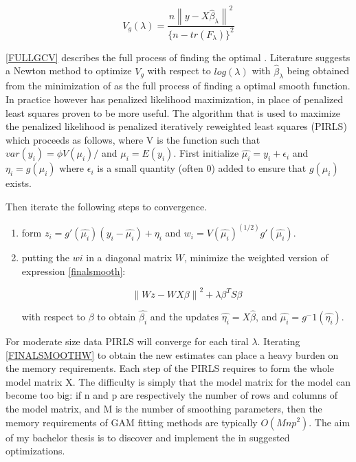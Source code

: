 \documentclass{article}
\begin{document}
    \begin{equation} \label{FULLGCV} V_g(\lambda) = \frac{n\left \| y-X\widehat{\beta}_\lambda \right \| ^2}{\{n-tr(F_\lambda) \}^2} \end{equation}

    \ref{FULLGCV} describes the full process of finding the optimal \textlambda.  Literature suggests a Newton method to optimize $V_g$ with respect to $log(\lambda)$ with $\widehat{\beta}_\lambda$ being obtained from the minimization of \label{finalsmooth} as the full process of finding a optimal smooth function. In practice however has penalized likelihood maximization, in place of penalized least squares proven to be more useful. The algorithm that is used to maximize the penalized likelihood is penalized iteratively reweighted least squares (PIRLS) which proceeds as follows, where V is the function such that $var(y_i) = \phi V(\mu_i)/$ and $\mu_i = E(y_i)$. First initialize $\widehat{\mu_i} = y_i + \epsilon_i $ and $\eta_i = g(\mu_i)$ where $\epsilon_i$ is a small quantity (often 0) added to ensure that $g(\mu_i)$ exists.

    Then iterate the following steps to convergence.
    \begin{enumerate}
    \item form $z_i = g'(\widehat{\mu_i})(y_i − \widehat{\mu_i}) + \eta_i$ and $w_i = V(\widehat{\mu_i})^(1/2) g'(\widehat{\mu_i})$.
    \item putting the $wi$ in a diagonal matrix $W$, minimize the weighted version of expression \ref{finalsmooth}:

    \begin{equation} \label{FINALSMOOTHW} \left \| Wz - WX\beta  \right \|^2 + \lambda \beta^T S\beta  \end{equation}


    with respect to $\beta$ to obtain $\widehat{\beta_i}$ and the updates $\widehat{\eta_i} =X\widehat{\beta}$, and $\widehat{\mu_i} =g^-1(\widehat{\eta_i})$.
    \end{enumerate}

    For moderate size data PIRLS will converge for each tiral $\lambda$. Iterating \ref{FINALSMOOTHW} to obtain the new estimates can place a heavy burden on the memory requirements. Each step of the PIRLS requires to form the whole model matrix X. The difficulty is simply that the model matrix for the model can become too big: if n and p are respectively the number of rows and columns of the model matrix, and M is the number of smoothing parameters, then the memory requirements of GAM fitting methods are typically $O(Mnp^2)$. The aim of my bachelor thesis is to discover and implement the in \cite{bigdataGAM} suggested optimizations.
\end{document}
